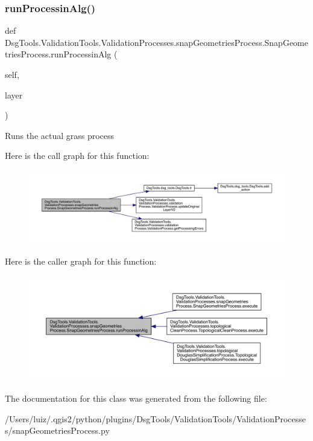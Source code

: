 \subsubsection{\texorpdfstring{run\+Processin\+Alg()}{runProcessinAlg()}}
{\footnotesize\ttfamily def Dsg\+Tools.\+Validation\+Tools.\+Validation\+Processes.\+snap\+Geometries\+Process.\+Snap\+Geometries\+Process.\+run\+Processin\+Alg (\begin{DoxyParamCaption}\item[{}]{self,  }\item[{}]{layer }\end{DoxyParamCaption})}

\begin{DoxyVerb}Runs the actual grass process
\end{DoxyVerb}
 Here is the call graph for this function\+:
\nopagebreak
\begin{figure}[H]
\begin{center}
\leavevmode
\includegraphics[width=350pt]{class_dsg_tools_1_1_validation_tools_1_1_validation_processes_1_1snap_geometries_process_1_1_snap_geometries_process_a540ebe68bd43383327a482fcf8829354_cgraph}
\end{center}
\end{figure}
Here is the caller graph for this function\+:
\nopagebreak
\begin{figure}[H]
\begin{center}
\leavevmode
\includegraphics[width=350pt]{class_dsg_tools_1_1_validation_tools_1_1_validation_processes_1_1snap_geometries_process_1_1_snap_geometries_process_a540ebe68bd43383327a482fcf8829354_icgraph}
\end{center}
\end{figure}


The documentation for this class was generated from the following file\+:\begin{DoxyCompactItemize}
\item 
/\+Users/luiz/.\+qgis2/python/plugins/\+Dsg\+Tools/\+Validation\+Tools/\+Validation\+Processes/snap\+Geometries\+Process.\+py\end{DoxyCompactItemize}
